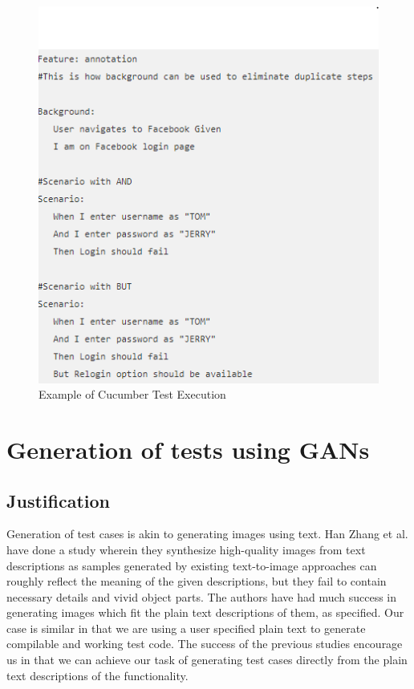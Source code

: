 \documentclass[conference]{IEEEtran}
\begin{document}
\begin{figure}
	\includegraphics[width=\linewidth]{cucumber_figure.png}
	\caption{Example of Cucumber Test Execution}
	\label{fig1}
\end{figure}

\section{Generation of tests using GANs}
\subsection{Justification}
Generation of test cases is akin to generating images using text. Han Zhang et al. have done a study wherein they synthesize high-quality images from text descriptions as samples generated by existing text-to-image approaches can roughly reflect the meaning of the given descriptions, but they fail to contain necessary details
and vivid object parts. The authors have had much success in generating images which fit the plain text descriptions of them, as specified.\cite{b5} Our case is similar in that we are using a user specified plain text to generate compilable and working test code. The success of the previous studies encourage us in that we can achieve our task of generating test cases directly from the plain text descriptions of the functionality.
\end{document}
